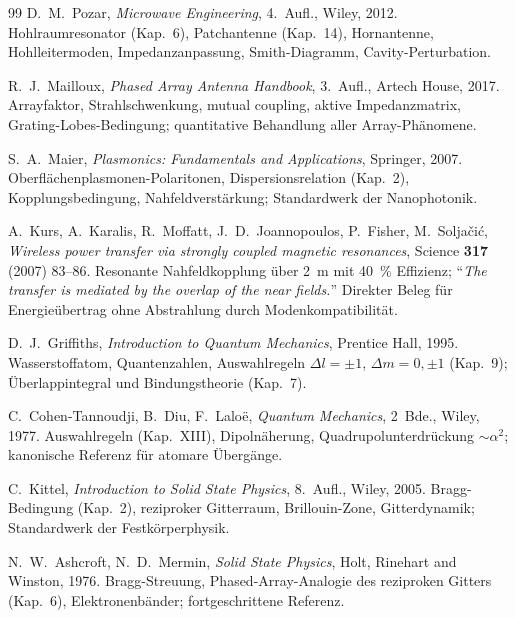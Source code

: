 \begin{thebibliography}{99}
D.~M.~Pozar,
\textit{Microwave Engineering},
4.~Aufl., Wiley, 2012.
Hohlraumresonator (Kap.~6), Patchantenne (Kap.~14), Hornantenne,
Hohlleitermoden, Impedanzanpassung, Smith-Diagramm, Cavity-Perturbation.

R.~J.~Mailloux,
\textit{Phased Array Antenna Handbook},
3.~Aufl., Artech House, 2017.
Arrayfaktor, Strahlschwenkung, mutual coupling, aktive Impedanzmatrix,
Grating-Lobes-Bedingung; quantitative Behandlung aller Array-Phänomene.

S.~A.~Maier,
\textit{Plasmonics: Fundamentals and Applications},
Springer, 2007.
Oberflächenplasmonen-Polaritonen, Dispersionsrelation (Kap.~2),
Kopplungsbedingung, Nahfeldverstärkung; Standardwerk der Nanophotonik.

A.~Kurs, A.~Karalis, R.~Moffatt, J.~D.~Joannopoulos,
P.~Fisher, M.~Soljačić,
\textit{Wireless power transfer via strongly coupled magnetic resonances},
Science \textbf{317} (2007) 83--86.
Resonante Nahfeldkopplung über 2~m mit 40~\% Effizienz;
``\textit{The transfer is mediated by the overlap of the near fields.}''
Direkter Beleg für Energieübertrag ohne Abstrahlung durch Modenkompatibilität.


D.~J.~Griffiths,
\textit{Introduction to Quantum Mechanics},
Prentice Hall, 1995.
Wasserstoffatom, Quantenzahlen, Auswahlregeln $\Delta l=\pm1$,
$\Delta m=0,\pm1$ (Kap.~9); Überlappintegral und Bindungstheorie (Kap.~7).

C.~Cohen-Tannoudji, B.~Diu, F.~Laloë,
\textit{Quantum Mechanics}, 2~Bde.,
Wiley, 1977.
Auswahlregeln (Kap.~XIII), Dipolnäherung, Quadrupolunterdrückung
$\sim\alpha^2$; kanonische Referenz für atomare Übergänge.


C.~Kittel,
\textit{Introduction to Solid State Physics},
8.~Aufl., Wiley, 2005.
Bragg-Bedingung (Kap.~2), reziproker Gitterraum, Brillouin-Zone,
Gitterdynamik; Standardwerk der Festkörperphysik.

N.~W.~Ashcroft, N.~D.~Mermin,
\textit{Solid State Physics},
Holt, Rinehart and Winston, 1976.
Bragg-Streuung, Phased-Array-Analogie des reziproken Gitters (Kap.~6),
Elektronenbänder; fortgeschrittene Referenz.



\end{thebibliography}
